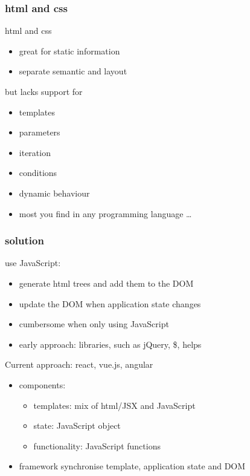 \begin{frame}[fragile] \frametitle{html and css}
html and css
\begin{itemize}
  \item great for static information
  \item separate semantic and layout
\end{itemize}
but lacks support for
\begin{itemize}
  \item templates
  \item parameters
  \item iteration
  \item conditions
  \item dynamic behaviour
  \item most you find in any programming language \ldots
\end{itemize}
\end{frame}

\begin{frame}[fragile] \frametitle{solution}
use JavaScript:
\begin{itemize}
  \item generate html trees and add them to the DOM
  \item update the DOM when application state changes
  \item cumbersome when only using JavaScript
  \item early approach: libraries, such as jQuery, \$, helps
\end{itemize}
\vspace{4mm}
Current approach: react, vue.js, angular
\begin{itemize}
  \item components:
  \begin{itemize}
    \item templates: mix of html/JSX and JavaScript
    \item state: JavaScript object
    \item functionality: JavaScript functions
  \end{itemize}
  \item framework synchronise template, application state and DOM
\end{itemize}
\end{frame}


